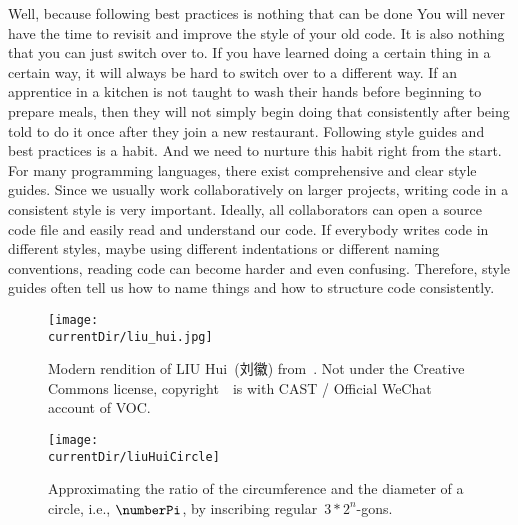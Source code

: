 Well, because following best practices is nothing that can be done 
You will never have the time to revisit and improve the style of your old code.
It is also nothing that you can just switch over to.
If you have learned doing a certain thing in a certain way, it will always be hard to switch over to a different way.
If an apprentice in a kitchen is not taught to wash their hands before beginning to prepare meals, then they will not simply begin doing that consistently after being told to do it once after they join a new restaurant.
Following style guides and best practices is a habit.
And we need to nurture this habit right from the start.%
%
%
%
For many programming languages, there exist comprehensive and clear style guides.
Since we usually work collaboratively on larger projects, writing code in a consistent style is very important.
Ideally, all collaborators can open a source code file and easily read and understand our code.
If everybody writes code in different styles, maybe using different indentations or different naming conventions, reading code can become harder and even confusing.
Therefore, style guides often tell us how to name things and how to structure code consistently.%
%
%
%
\FloatBarrier%
\endhsection%
%
%
\label{sec:approximatePiLiuHui}%
%
\begin{figure}%
\centering%
\texttt{[image: \\currentDir/liu\_hui.jpg]}%
\caption{Modern rendition of LIU Hui~(刘徽) from~\cite{Y2024COACMMLHFHTIOMACE}. %
Not under the Creative Commons license, copyright~\textcopyright\ is with CAST / Official WeChat account of VOC.}%
\label{fig:liu_hui}%
\end{figure}%
%
\begin{figure}%
\centering%
\texttt{[image: \\currentDir/liuHuiCircle]}%
\caption{Approximating the ratio of the circumference and the diameter of a circle, i.e., $\numberPi$, by inscribing regular~$3*2^n$-gons.}%
\label{fig:liuHuiCircle}%
\end{figure}%
